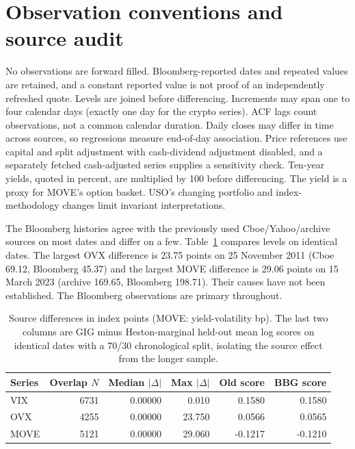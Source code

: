 \section{Observation conventions and source audit}
\label{supp:conventions}
No observations are forward filled. Bloomberg-reported dates and repeated values
are retained, and a constant reported value is not proof of an independently refreshed
quote. Levels are joined before differencing. Increments may span one to four
calendar days (exactly one day for the crypto series). ACF lags count observations,
not a common calendar duration. Daily closes may differ in time across sources, so
regressions measure end-of-day association. Price references use capital and split
adjustment with cash-dividend adjustment disabled, and a separately fetched
cash-adjusted series supplies a sensitivity check. Ten-year yields, quoted in
percent, are multiplied by 100 before differencing. The yield is a proxy for
MOVE's option basket. USO's changing portfolio and index-methodology changes limit
invariant interpretations.

The Bloomberg histories agree with the previously used Cboe/Yahoo/archive sources
on most dates and differ on a few. Table~\ref{tab:provider-overlap} compares levels
on identical dates. The largest OVX difference is 23.75 points on 25 November 2011
(Cboe 69.12, Bloomberg 45.37) and the largest MOVE difference is 29.06 points on
15 March 2023 (archive 169.65, Bloomberg 198.71). Their causes have not been
established. The Bloomberg observations are primary throughout.

\begin{table}[htbp]\centering\small\begin{tabular}{@{}l r r r r r@{}}\toprule Series & Overlap $N$ & Median $|\Delta|$ & Max $|\Delta|$ & Old score & BBG score\\\midrule

VIX & 6731 & 0.00000 & 0.010 & 0.1580 & 0.1580 \\

OVX & 4255 & 0.00000 & 23.750 & 0.0566 & 0.0565 \\

MOVE & 5121 & 0.00000 & 29.060 & -0.1217 & -0.1210 \\

\bottomrule\end{tabular}
\caption{Source differences in index points (MOVE: yield-volatility bp). The last two
columns are GIG minus Heston-marginal held-out mean log scores on identical dates
with a 70/30 chronological split, isolating the source effect from the longer sample.}
\label{tab:provider-overlap}\end{table}


